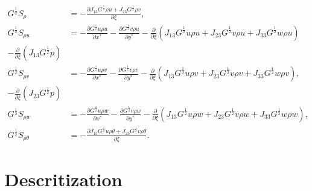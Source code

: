 \begin{align}
  G^{\frac{1}{2}}S_\rho &=      
  - \frac{\partial J_{13}G^{\frac{1}{2}}\rho u + J_{23}G^{\frac{1}{2}}\rho v}{\partial \xi}, \\
  G^{\frac{1}{2}}S_{\rho u}
  &= - \frac{\partial G^{\frac{1}{2}}u\rho u}{\partial x^*}
     - \frac{\partial G^{\frac{1}{2}}v\rho u}{\partial y^*}
     - \frac{\partial}{\partial \xi}(J_{13}G^{\frac{1}{2}}u\rho u + J_{23}G^{\frac{1}{2}}v\rho u + J_{33}G^{\frac{1}{2}}w\rho u) \nonumber\\
     - \frac{\partial}{\partial \xi}(J_{13}G^{\frac{1}{2}}p) \\
  G^{\frac{1}{2}}S_{\rho v}
  &= - \frac{\partial G^{\frac{1}{2}}u\rho v}{\partial x^*}
     - \frac{\partial G^{\frac{1}{2}}v\rho v}{\partial y^*}
     - \frac{\partial}{\partial \xi}(J_{13}G^{\frac{1}{2}}u\rho v + J_{23}G^{\frac{1}{2}}v\rho v + J_{33}G^{\frac{1}{2}}w\rho v), \nonumber\\
     - \frac{\partial}{\partial \xi}(J_{23}G^{\frac{1}{2}}p) \\
  G^{\frac{1}{2}}S_{\rho w}
  &= - \frac{\partial G^{\frac{1}{2}}u\rho w}{\partial x^*}
     - \frac{\partial G^{\frac{1}{2}}v\rho w}{\partial y^*}
     - \frac{\partial}{\partial \xi}(J_{13}G^{\frac{1}{2}}u\rho w + J_{23}G^{\frac{1}{2}}v\rho w + J_{33}G^{\frac{1}{2}}w\rho w), \\
  G^{\frac{1}{2}}S_{\rho\theta} &= 
  - \frac{\partial J_{13}G^{\frac{1}{2}}u\rho\theta+J_{23}G^{\frac{1}{2}}v\rho\theta}{\partial \xi}.
\end{align}

\section{Descritization}

